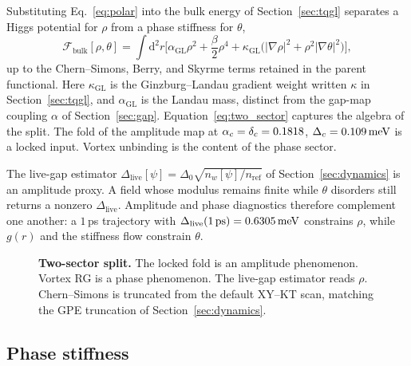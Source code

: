 Substituting Eq.~\eqref{eq:polar} into the bulk \TQGL{} energy of Section~\ref{sec:tqgl} separates a Higgs potential for $\rho$ from a phase stiffness for $\theta$,
\begin{equation}
\mathcal{F}_{\mathrm{bulk}}[\rho,\theta]
=\int\mathrm{d}^2r\Biggl[
\alpha_{\mathrm{GL}}\rho^2+\frac{\beta}{2}\rho^4
+\kappa_{\mathrm{GL}}\bigl(|\nabla\rho|^2+\rho^2|\nabla\theta|^2\bigr)
\Biggr],
\label{eq:two_sector}
\end{equation}
up to the Chern--Simons, Berry, and Skyrme terms retained in the parent functional. Here $\kappa_{\mathrm{GL}}$ is the Ginzburg--Landau gradient weight written $\kappa$ in Section~\ref{sec:tqgl}, and $\alpha_{\mathrm{GL}}$ is the Landau mass, distinct from the gap-map coupling $\alpha$ of Section~\ref{sec:gap}. Equation~\eqref{eq:two_sector} captures the algebra of the split. The fold of the amplitude map at $\alpha_c=\delta_c=0.1818$, $\Delta_c=0.109\,\mathrm{meV}$ is a locked input. Vortex unbinding is the content of the phase sector.

The live-gap estimator $\Delta_{\mathrm{live}}[\psi]=\Delta_0\sqrt{n_w[\psi]/n_{\mathrm{ref}}}$ of Section~\ref{sec:dynamics} is an amplitude proxy. A field whose modulus remains finite while $\theta$ disorders still returns a nonzero $\Delta_{\mathrm{live}}$. Amplitude and phase diagnostics therefore complement one another: a $1$\,ps trajectory with $\Delta_{\mathrm{live}}(1\,\mathrm{ps})=0.6305\,\mathrm{meV}$ constrains $\rho$, while $g(r)$ and the stiffness flow constrain $\theta$.

\begin{figure}[htbp]
\centering

\caption{\textbf{Two-sector split.} The locked fold is an amplitude phenomenon. Vortex RG is a phase phenomenon. The live-gap estimator reads $\rho$. Chern--Simons is truncated from the default XY--KT scan, matching the GPE truncation of Section~\ref{sec:dynamics}.}
\label{fig:two_sector}
\end{figure}

\subsection{Phase stiffness}
\label{sec:stiffness}

